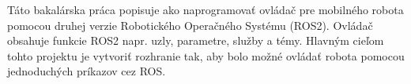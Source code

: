 Táto bakalárska práca popisuje ako naprogramovať ovládač pre mobilného robota pomocou druhej verzie Robotického Operačného Systému (ROS2).
Ovládač obsahuje funkcie ROS2 napr. uzly, parametre, služby a témy. Hlavným cieľom tohto projektu je vytvoriť rozhranie tak, aby
bolo možné ovládať robota pomocou jednoduchých príkazov cez ROS.


